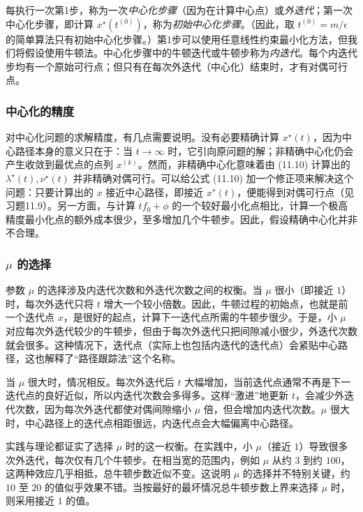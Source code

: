 每执行一次第1步，称为一次\emph{中心化步骤}（因为在计算中心点）或\emph{外迭代}；第一次中心化步骤，即计算 $x^\star(t^{(0)})$，称为\emph{初始中心化步骤}。（因此，取 $t^{(0)}=m/\epsilon$ 的简单算法只有初始中心化步骤。）第1步可以使用任意线性约束最小化方法，但我们将假设使用牛顿法。中心化步骤中的牛顿迭代或牛顿步称为\emph{内迭代}。每个内迭代步均有一个原始可行点；但只有在每次外迭代（中心化）结束时，才有对偶可行点。

\subsubsection*{中心化的精度}
对中心化问题的求解精度，有几点需要说明。没有必要精确计算 $x^\star(t)$，因为中心路径本身的意义只在于：当 $t\to\infty$ 时，它引向原问题的解；非精确中心化仍会产生收敛到最优点的点列 $x^{(k)}$。然而，非精确中心化意味着由 (11.10) 计算出的 $\lambda^\star(t),\nu^\star(t)$ 并非精确对偶可行。可以给公式 (11.10) 加一个修正项来解决这个问题：只要计算出的 $x$ 接近中心路径，即接近 $x^\star(t)$，便能得到对偶可行点（见习题11.9）。另一方面，与计算 $tf_0+\phi$ 的一个较好最小化点相比，计算一个极高精度最小化点的额外成本很少，至多增加几个牛顿步。因此，假设精确中心化并非不合理。

\subsubsection*{$\mu$ 的选择}
参数 $\mu$ 的选择涉及内迭代次数和外迭代次数之间的权衡。当 $\mu$ 很小（即接近 $1$）时，每次外迭代只将 $t$ 增大一个较小倍数。因此，牛顿过程的初始点，也就是前一个迭代点 $x$，是很好的起点，计算下一迭代点所需的牛顿步很少。于是，小 $\mu$ 对应每次外迭代较少的牛顿步，但由于每次外迭代只把间隙减小很少，外迭代次数就会很多。这种情况下，迭代点（实际上也包括内迭代的迭代点）会紧贴中心路径，这也解释了“路径跟踪法”这个名称。

当 $\mu$ 很大时，情况相反。每次外迭代后 $t$ 大幅增加，当前迭代点通常不再是下一迭代点的良好近似，所以内迭代次数会多得多。这样“激进”地更新 $t$，会减少外迭代次数，因为每次外迭代都使对偶间隙缩小 $\mu$ 倍，但会增加内迭代次数。$\mu$ 很大时，中心路径上的迭代点相距很远，内迭代点会大幅偏离中心路径。

实践与理论都证实了选择 $\mu$ 时的这一权衡。在实践中，小 $\mu$（接近 $1$）导致很多次外迭代，每次仅有几个牛顿步。在相当宽的范围内，例如 $\mu$ 从约 $3$ 到约 $100$，这两种效应几乎相抵，总牛顿步数近似不变。这说明 $\mu$ 的选择并不特别关键，约 $10$ 至 $20$ 的值似乎效果不错。当按最好的最坏情况总牛顿步数上界来选择 $\mu$ 时，则采用接近 $1$ 的值。

